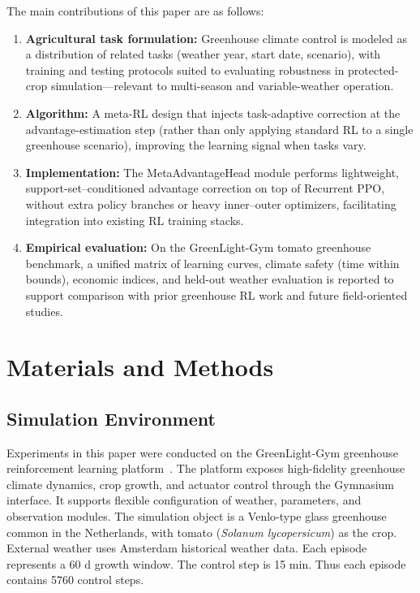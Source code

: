 \documentclass[number,preprint,review,12pt]{elsarticle}
\begin{document}
The main contributions of this paper are as follows:
\begin{enumerate}
    \item \textbf{Agricultural task formulation:} Greenhouse climate control is modeled as a distribution of related tasks (weather year, start date, scenario), with training and testing protocols suited to evaluating robustness in protected-crop simulation---relevant to multi-season and variable-weather operation.
    \item \textbf{Algorithm:} A meta-RL design that injects task-adaptive correction at the advantage-estimation step (rather than only applying standard RL to a single greenhouse scenario), improving the learning signal when tasks vary.
    \item \textbf{Implementation:} The MetaAdvantageHead module performs lightweight, support-set--conditioned advantage correction on top of Recurrent PPO, without extra policy branches or heavy inner--outer optimizers, facilitating integration into existing RL training stacks.
    \item \textbf{Empirical evaluation:} On the GreenLight-Gym tomato greenhouse benchmark, a unified matrix of learning curves, climate safety (time within bounds), economic indices, and held-out weather evaluation is reported to support comparison with prior greenhouse RL work and future field-oriented studies.
\end{enumerate}

\section{Materials and Methods}
\subsection{Simulation Environment}
Experiments in this paper were conducted on the GreenLight-Gym greenhouse reinforcement learning platform~\cite{van2025greenlight,vanhenten2006greenhouse,taksen2024gymnasium}. The platform exposes high-fidelity greenhouse climate dynamics, crop growth, and actuator control through the Gymnasium interface. It supports flexible configuration of weather, parameters, and observation modules. The simulation object is a Venlo-type glass greenhouse common in the Netherlands, with tomato (\textit{Solanum lycopersicum}) as the crop. External weather uses Amsterdam historical weather data. Each episode represents a 60 d growth window. The control step is 15 min. Thus each episode contains 5760 control steps.
\end{document}
